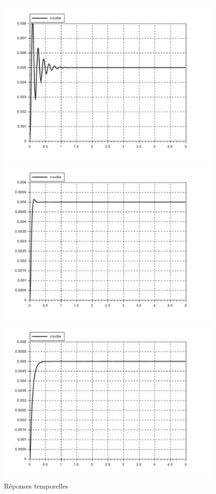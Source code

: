 \begin{figure}[ht!]
\begin{center}
\begin{minipage}{0.3\linewidth}
 \includegraphics[width=0.8\linewidth]{img/Inf}
\end{minipage}\hfill
\begin{minipage}{0.3\linewidth}
 \includegraphics[width=0.8\linewidth]{img/Int}
\end{minipage}\hfill
\begin{minipage}{0.3\linewidth}
 \includegraphics[width=0.8\linewidth]{img/Sup}
\end{minipage}\hfill
\end{center}
\caption{Réponses temporelles}
\label{fig20}
\end{figure}

